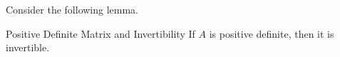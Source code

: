 
Consider the following lemma.

\begin{lemma}{Positive Definite Matrix and Invertibility}\label{lem:posdefiniteinvertible}
If $A$ is positive definite, then it is invertible.
\end{lemma}

